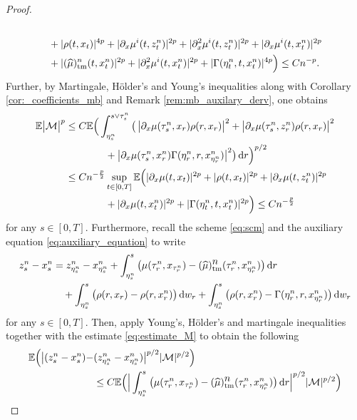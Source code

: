 \documentclass[reqno,  oneside, 12pt]{amsart}
\newcommand{\E}{\mathbb E}
\begin{document}
\begin{proof}
\begin{align}
		\\
		&\quad+|\rho(t,x_{t})|^{4p}+|\partial_x \mu^{i}(t,z_{t}^n)|^{2p}+|\partial_x^2 \mu^{i}(t,z_{t}^n)|^{2p}+|\partial_x \mu^{i}(t,x_{t}^n)|^{2p}  \notag
		\\
		&\quad+|(\widehat \mu)_{\mathrm{tm}}^{n}(t,x_{t}^{n})|^{2p}+|\partial_x^2 \mu^{i}(t,x_{t}^n)|^{2p}+|{\Gamma}(\eta^n_t,t,x_{t}^{n})|^{4p}\Big)\leq Cn^{-p}.
	\end{align}
	Further, by  Martingale, H\"older's and Young's inequalities along with   Corollary \ref{cor:_coefficients_mb} and Remark \ref{rem:mb_auxilary_derv}, one obtains
	\begin{align} \label{eq:estimate_M}
		\E\big|\mathcal M\big|^p&\leq   C\E\Big(\int_{\eta^n_s}^{s\vee\tau^n_s} \big(\,\big|\partial_x \mu(\tau^n_s, x_{r}){\rho}(r,x_{r})\big|^2+ \big|\partial_x \mu(\tau^n_s, z_{r}^n){\rho}(r,x_{r})\big|^2  \notag
		\\
		&\qquad\qquad+ \big| \partial_x \mu(\tau^n_s, x_{r}^{n}){\Gamma}(\eta^n_r,r,x_{\eta^n_r}^{n})\big|^2\big )  \, \mathrm{d}r\Big)^{p/2} \notag
		\\
		&\leq  Cn^{-\frac{p}{2}}\sup_{t\in[0,T]} \E\Big(|\partial_x \mu(t, x_{t})|^{2p}+|{\rho}(t,x_{t})|^{2p}+|\partial_x \mu(t, z_{t}^n)|^{2p}  \notag
		\\
		&\qquad\qquad+ |\partial_x \mu(t, x_{t}^{n})|^{2p}+|{\Gamma}(\eta^n_t,t,x_{t}^{n})|^{2p}\Big)
		\leq Cn^{-\frac{p}{2}} 
	\end{align}
	for any $s\in[0,T]$.
	Furthermore, recall the scheme \eqref{eq:scm} and the auxiliary equation \eqref{eq:auxiliary_equation} to write
	\begin{align*}
		z_s^n-x_s^n&=z_{\eta^n_s}^n-x_{\eta^n_s}^n
		+\int_{\eta^n_s}^s\big(\mu(\tau_r^n,x_{\tau^n_r})-(\widehat {\mu})_{\mathrm{tm}}^{\displaystyle n}(\tau_r^n,x_{\eta^n_r}^{n})\big)\, \mathrm{d}r\notag
		\\
		&
		\quad+\int_{\eta^n_s}^s\big(\rho(r,x_r)-\rho(r,x_r^{n})\big)\, \mathrm{d}w_r
		+\int_{\eta^n_s}^s\big(\rho(r,x_r^{n})-{\Gamma}(\eta^n_r,r,x_{\eta^n_r}^{n})\big)\, \mathrm{d}w_r \notag
	\end{align*}
	for any $s\in[0,T]$.
	Then, apply 
	Young's, H\"older's  and martingale inequalities together with the estimate \eqref{eq:estimate_M}  to obtain the following
	\begin{align} \label{eq:martingale_related_term}
		\E  \Big(\big|(z_s^n-x_s^n)-&(z_{\eta^n_s}^n-x_{\eta^n_s}^n)\big|^{p/2}|\mathcal M|^{p/2}\Big) \notag
		\\
		&
		\leq C\E\Big(\Big|\int_{\eta^n_s}^s\big(\mu(\tau_r^n,x_{\tau^n_r})-(\widehat {\mu})_{\mathrm{tm}}^{\displaystyle n}(\tau_r^n,x_{\eta^n_r}^{n})\big)\, \mathrm{d}r\Big|^{p/2}|\mathcal M|^{p/2}\Big)\notag

\end{align}
\end{proof}
\end{document}
